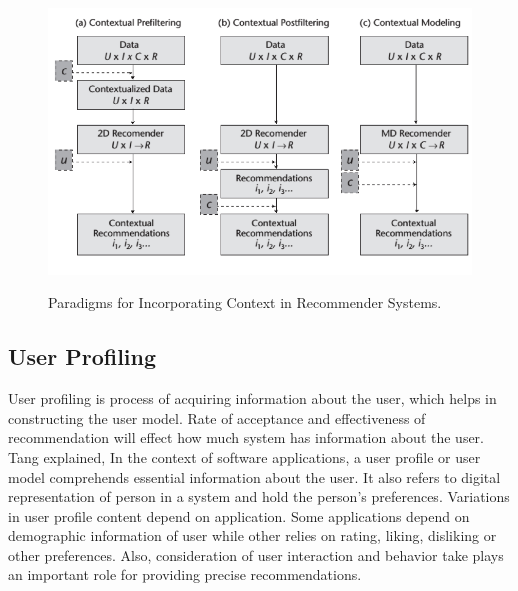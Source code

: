 \begin{figure}[h]
	\centering
	\includegraphics[width=1\linewidth]{figures/ch2_context_recommender_system_paradigms.png}
	\caption{Paradigms for Incorporating Context in Recommender Systems.}
	\cite{adomavicius2011context}
	\label{fig:ch2_context_recommender_system_paradigms}
\end{figure}


\subsection{User Profiling}

User profiling is process of acquiring information about the user, which helps in constructing the user model. Rate of acceptance and effectiveness of recommendation will effect how much system has information about the user. Tang \cite{tang2010combination} explained, In the context of software applications, a user profile or user model comprehends essential information about the user. It also refers to digital representation of person in a system and hold the person’s preferences. Variations in user profile content depend on application. Some applications depend on demographic information of user while other relies on rating, liking, disliking or other preferences. Also, consideration of user interaction and behavior take plays an important role for providing precise recommendations.\newline

